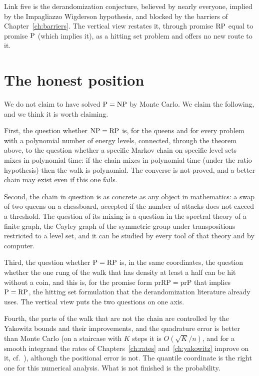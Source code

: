 Link five is the derandomization conjecture, believed by nearly everyone, implied by the Impagliazzo Wigderson hypothesis, and blocked by the barriers of Chapter~\ref{ch:barriers}. The vertical view restates it, through promise $\mathrm{RP}$ equal to promise $\mathrm{P}$ (which implies it), as a hitting set problem and offers no new route to it.

\section{The honest position}

We do not claim to have solved $\mathrm{P} = \mathrm{NP}$ by Monte Carlo. We claim the following, and we think it is worth claiming.

First, the question whether $\mathrm{NP} = \mathrm{RP}$ is, for the queens and for every problem with a polynomial number of energy levels, connected, through the theorem above, to the question whether a specific Markov chain on specific level sets mixes in polynomial time: if the chain mixes in polynomial time (under the ratio hypothesis) then the walk is polynomial. The converse is not proved, and a better chain may exist even if this one fails.

Second, the chain in question is as concrete as any object in mathematics: a swap of two queens on a chessboard, accepted if the number of attacks does not exceed a threshold. The question of its mixing is a question in the spectral theory of a finite graph, the Cayley graph of the symmetric group under transpositions restricted to a level set, and it can be studied by every tool of that theory and by computer.

Third, the question whether $\mathrm{P} = \mathrm{RP}$ is, in the same coordinates, the question whether the one rung of the walk that has density at least a half can be hit without a coin, and this is, for the promise form $\mathrm{prRP} = \mathrm{prP}$ that implies $\mathrm{P} = \mathrm{RP}$, the hitting set formulation that the derandomization literature already uses. The vertical view puts the two questions on one axis.

Fourth, the parts of the walk that are not the chain are controlled by the Yakowitz bounds and their improvements, and the quadrature error is better than Monte Carlo (on a staircase with $K$ steps it is $O(\sqrt K / n)$, and for a smooth integrand the rates of Chapters~\ref{ch:rates} and~\ref{ch:yakowitz} improve on it, cf.\ \cite{YKS}), although the positional error is not. The quantile coordinate is the right one for this numerical analysis. What is not finished is the probability.

